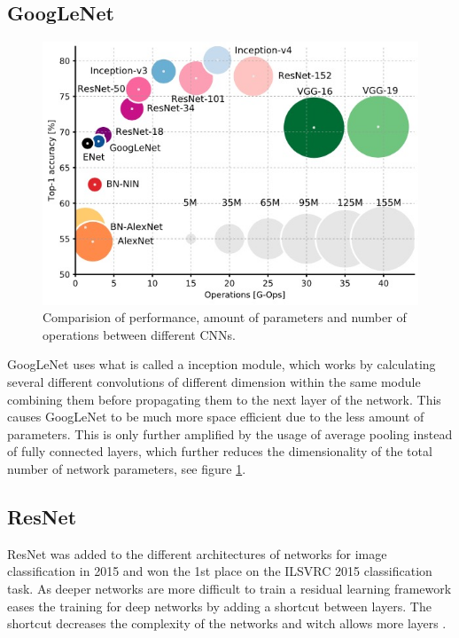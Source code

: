 \documentclass{kthreport}
\begin{document}
\subsection{GoogLeNet}
\begin{figure}
  \includegraphics[width=\linewidth]{../images/graph_cnns.jpg}
  \caption[]
  {\small Comparision of performance, amount of parameters and number of operations between different CNNs.}
  \label{wrap-fig:graph_cnns}
\end{figure}
GoogLeNet uses what is called a inception module, which works by calculating several different convolutions of different dimension within the same module combining them before propagating them to the next layer of the network\cite{szegedy2016rethinking}. This causes GoogLeNet to be much more space efficient due to the less  amount of parameters. This is only further amplified by the usage of average pooling instead of fully connected layers, which further reduces the dimensionality of the total number of network parameters, see figure \ref{wrap-fig:graph_cnns}. \\

\subsection{ResNet}
ResNet was added to the different architectures of networks for image classification in 2015 and won the 1st place on the ILSVRC 2015 classification task. As deeper networks are more difficult to train a residual learning framework eases the training for deep networks by adding a shortcut between layers. The shortcut decreases the complexity of the networks and witch allows more layers \cite{HeZRS15}.
\end{document}
